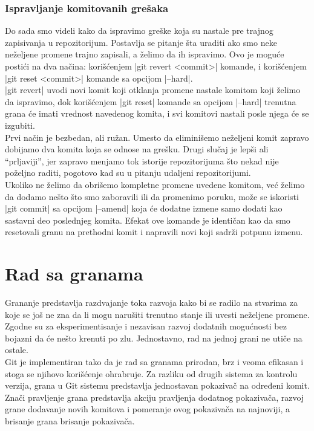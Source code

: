 \documentclass[a4paper]{article}
\begin{document}
{\subsubsection*{Ispravljanje komitovanih grešaka}
\label{komitovane_greske}
Do sada smo videli kako da ispravimo greške koja su nastale pre trajnog zapisivanja u repozitorijum. Postavlja se pitanje šta uraditi ako smo neke neželjene promene trajno zapisali, a želimo da ih ispravimo. Ovo je moguće postići na dva načina: korišćenjem |git revert <commit>| komande, i korišćenjem |git reset <commit>| komande sa opcijom |--hard|.\\
|git revert| uvodi novi komit koji otklanja promene nastale komitom koji želimo da ispravimo, dok korišćenjem |git reset| komande sa opcijom |--hard| trenutna grana će imati vrednost navedenog komita, i svi komitovi nastali posle njega će se izgubiti. \\
Prvi način je bezbedan, ali ružan. Umesto da eliminišemo neželjeni komit zapravo dobijamo dva komita koja se odnose na grešku. Drugi slučaj je lepši ali ``prljaviji'', jer zapravo menjamo tok istorije repozitorijuma što nekad nije poželjno raditi, pogotovo kad su u pitanju udaljeni repozitorijumi. \\
Ukoliko ne želimo da obrišemo kompletne promene uvedene komitom, već želimo da dodamo nešto što smo zaboravili ili da promenimo poruku, može se iskoristi |git commit| sa opcijom |--amend| koja će dodatne izmene samo dodati kao sastavni deo poslednjeg komita. Efekat ove komande je identičan kao da smo resetovali granu na prethodni komit i napravili novi koji sadrži potpunu izmenu.


\section{Rad sa granama}
\label{sec:grane}
Grananje predstavlja razdvajanje toka razvoja kako bi se radilo na stvarima za koje se još ne zna da li mogu narušiti trenutno stanje ili uvesti neželjene promene. Zgodne su za eksperimentisanje i nezavisan razvoj dodatnih mogućnosti bez bojazni da će nešto krenuti po zlu. Jednostavno, rad na jednoj grani ne utiče na ostale.\\
Git je implementiran tako da je rad sa granama prirodan, brz i veoma efikasan i stoga se njihovo korišćenje ohrabruje. Za razliku od drugih sistema za kontrolu verzija, grana u Git sistemu predstavlja jednostavan pokazivač na određeni komit. Znači pravljenje grana predstavlja akciju pravljenja dodatnog pokazivača, razvoj grane dodavanje novih komitova i pomeranje ovog pokazivača na najnoviji, a brisanje grana brisanje pokazivača.

}
\end{document}
